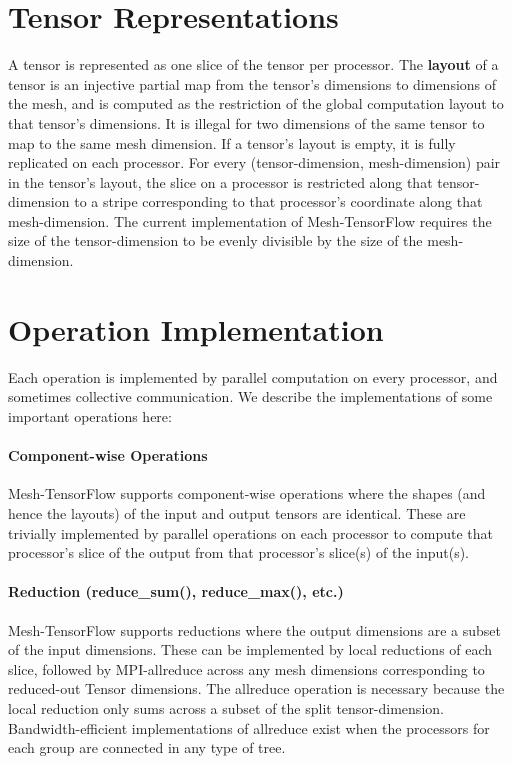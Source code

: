 \documentclass{article}
\begin{document}
\section{Tensor Representations}
A tensor is represented as one slice of the tensor per processor.  The \textbf{layout} of a tensor is an injective partial map from the tensor's dimensions to dimensions of the mesh, and is computed as the restriction of the global computation layout to that tensor's dimensions.  It is illegal for two dimensions of the same tensor to map to the same mesh dimension.  If a tensor's layout is empty, it is fully replicated on each processor.  For every (tensor-dimension, mesh-dimension) pair in the tensor's layout, the slice on a processor is restricted along that tensor-dimension to a stripe corresponding to that processor's coordinate along that mesh-dimension.   The current implementation of Mesh-TensorFlow requires the size of the tensor-dimension to be evenly divisible by the size of the mesh-dimension.


\section{Operation Implementation}
Each operation is implemented by parallel computation on every processor, and sometimes collective communication.  We describe the implementations of some important operations here:

\paragraph{Component-wise Operations} Mesh-TensorFlow supports component-wise operations where the shapes (and hence the layouts) of the input and output tensors are identical.  These are trivially implemented by parallel operations on each processor to compute that processor's slice of the output from that processor's slice(s) of the input(s).

\paragraph{Reduction (reduce\_sum(), reduce\_max(), etc.)}  Mesh-TensorFlow supports reductions where the output dimensions are a subset of the input dimensions.  These can be implemented by local reductions of each slice, followed by MPI-allreduce across any mesh dimensions corresponding to reduced-out Tensor dimensions.  The allreduce operation is necessary because the local reduction only sums across a subset of the split tensor-dimension.  Bandwidth-efficient implementations of allreduce exist when the processors for each group are connected in any type of tree. \cite{Patarasuk2009} \cite{Jain10y.:optimal}
\end{document}
